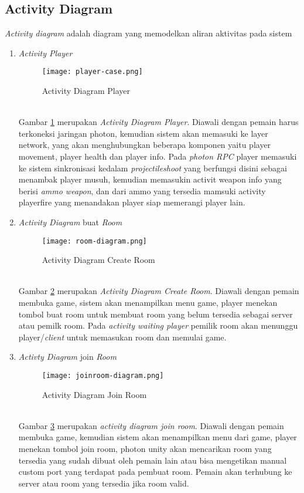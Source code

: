\subsection{Activity Diagram}
\textit{Activity diagram} adalah diagram yang memodelkan aliran aktivitas pada sistem
\begin{enumerate}
    \item \textit{Activity Player}
    \begin{figure}[h]
        \centering
        \texttt{[image: player-case.png]}
        \caption{Activity Diagram Player}
        \label{fig:player-case}
    \end{figure}
    \\ Gambar \ref{fig:player-case} merupakan \textit{Activity Diagram Player}. Diawali dengan pemain harus terkoneksi jaringan photon, kemudian sistem akan memasuki ke layer network, yang akan menghubungkan beberapa komponen yaitu player movement, player health dan player info.
    Pada \textit{photon RPC} player memasuki ke sistem sinkronisasi kedalam \textit{projectileshoot} yang berfungsi disini sebagai menambak player musuh, kemudian memasukin activit weapon info yang berisi \textit{ammo weapon}, dan dari ammo yang tersedia mamsuki activity playerfire yang menandakan player siap memerangi player lain.
    \newpage
    \item \textit{Activity Diagram} buat \textit{Room}
     \begin{figure}[h]
        \centering
        \texttt{[image: room-diagram.png]}
        \caption{Activity Diagram Create Room}
        \label{fig:croom-case}
    \end{figure}
    \\ Gambar \ref{fig:croom-case} merupakan \textit{Activity Diagram Create Room}. Diawali dengan pemain membuka game, sistem akan menampilkan menu game, player menekan tombol buat room untuk membuat room yang belum tersedia sebagai server atau pemilk room.
    Pada \textit{activity waiting player} pemilik room akan menunggu player/\textit{client} untuk memasukan room dan memulai game.
    \newpage
    \item \textit{Activty Diagram} join \textit{Room}
    \begin{figure}[h]
        \centering
        \texttt{[image: joinroom-diagram.png]}
        \caption{Activity Diagram Join Room}
        \label{fig:jroom-case}
    \end{figure}
    \\ Gambar \ref{fig:jroom-case} merupakan \textit{activity diagram join room}. Diawali dengan pemain membuka game, kemudian sistem akan menampilkan menu dari game, player menekan tombol join room, photon unity akan mencarikan room yang tersedia yang sudah dibuat oleh pemain lain atau bisa mengetikan manual custom port yang terdapat pada pembuat room. Pemain akan terhubung ke server atau room yang tersedia jika room valid.

\end{enumerate}

